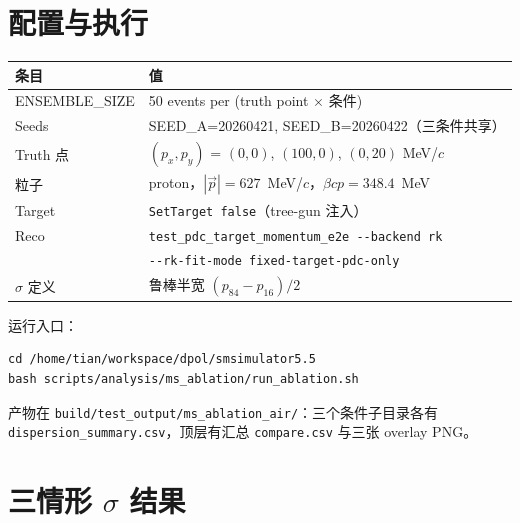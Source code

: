 \documentclass[a4paper, 11pt]{article}
\begin{document}
\section{配置与执行}

\begin{center}
\begin{tabular}{ll}
\toprule
条目 & 值 \\
\midrule
ENSEMBLE\_SIZE              & 50 events per (truth point $\times$ 条件) \\
Seeds                       & SEED\_A=20260421, SEED\_B=20260422（三条件共享） \\
Truth 点                    & $(p_x, p_y)$ = $(0,0)$, $(100,0)$, $(0,20)$ MeV/$c$ \\
粒子                        & proton，$|\vec p|=627$~MeV/$c$，$\beta c p = 348.4$~MeV \\
Target                      & \texttt{SetTarget false}（tree-gun 注入） \\
Reco                        & \verb|test_pdc_target_momentum_e2e --backend rk|\\
                            & \verb|--rk-fit-mode fixed-target-pdc-only| \\
$\sigma$ 定义               & 鲁棒半宽 $(p_{84}-p_{16})/2$ \\
\bottomrule
\end{tabular}
\end{center}

运行入口：
\begin{verbatim}
cd /home/tian/workspace/dpol/smsimulator5.5
bash scripts/analysis/ms_ablation/run_ablation.sh
\end{verbatim}

产物在 \verb|build/test_output/ms_ablation_air/|：三个条件子目录各有 \texttt{dispersion\_summary.csv}，顶层有汇总 \texttt{compare.csv} 与三张 overlay PNG。

\section{三情形 $\sigma$ 结果}
\end{document}
